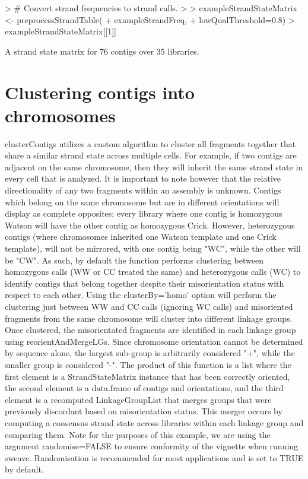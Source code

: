 \documentclass{article}
\begin{document}
\begin{Schunk}
\begin{Sinput}
> # Convert strand frequencies to strand calls.
> 
> exampleStrandStateMatrix <- preprocessStrandTable(
+ exampleStrandFreq, 
+ lowQualThreshold=0.8)
> exampleStrandStateMatrix[[1]]
\end{Sinput}
\begin{Soutput}
A strand state matrix for 76 contigs over 35 libraries.
\end{Soutput}
\end{Schunk}

\section{Clustering contigs into chromosomes}

clusterContigs utilizes a custom algorithm to cluster all fragments together that share a similar strand state across multiple cells.  For example, if two contigs are adjacent on the same chromosome, then they will inherit the same strand state in every cell that is analyzed.  It is important to note however that the relative directionality of any two fragments within an assembly is unknown. Contigs which belong on the same chromosome but are in different orientations will display as complete opposites; every library where one contig is homozygous Watson will have the other contig as homozygous Crick.  However, heterozygous contigs (where chromosomes inherited one Watson template and one Crick template), will not be mirrored, with one contig being "WC", while the other will be "CW". As such, by default the function performs clustering between homozygous calls (WW or CC treated the same) and heterozygous calls (WC) to identify contigs that belong together despite their misorientation status with respect to each other. Using the clusterBy='homo' option will perform the clustering just between WW and CC calls (ignoring WC calls) and misoriented fragments from the same chromosome will cluster into different linkage groups. Once clustered, the misorientated fragments are identified in each linkage group using reorientAndMergeLGs. Since chromosome orientation cannot be determined by sequence alone, the largest sub-group is arbitrarily considered "+", while the smaller group is considered "-". The product of this function is a list where the first element is a StrandStateMatrix instance that has been correctly oriented, the second element is a data.frame of contigs and orientations, and the third element is a recomputed LinkageGroupList that merges groups that were previously discordant based on misorientation status. This merger occurs by computing a consensus strand state across libraries within each linkage group and comparing them.   Note for the purposes of this example, we are using the argument randomise=FALSE to ensure conformity of the vignette when running sweave. Randomisation is recommended for most applications and is set to TRUE by default.
\end{document}
